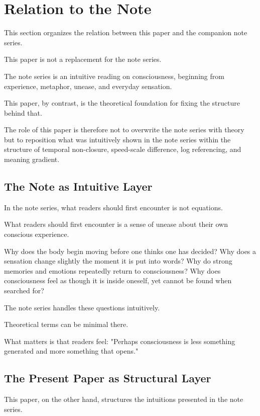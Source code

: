 \section{Relation to the Note}


This section organizes the relation between this paper and the companion note series.

This paper is not a replacement for the note series.

The note series is an intuitive reading on consciousness, beginning from experience, metaphor, unease, and everyday sensation.

This paper, by contrast, is the theoretical foundation for fixing the structure behind that.

The role of this paper is therefore not to overwrite the note series with theory but to reposition what was intuitively shown in the note series within the structure of temporal non-closure, speed-scale difference, log referencing, and meaning gradient.

\subsection{The Note as Intuitive Layer}


In the note series, what readers should first encounter is not equations.

What readers should first encounter is a sense of unease about their own conscious experience.

Why does the body begin moving before one thinks one has decided? Why does a sensation change slightly the moment it is put into words? Why do strong memories and emotions repeatedly return to consciousness? Why does consciousness feel as though it is inside oneself, yet cannot be found when searched for?

The note series handles these questions intuitively.

Theoretical terms can be minimal there.

What matters is that readers feel: "Perhaps consciousness is less something generated and more something that opens."

\subsection{The Present Paper as Structural Layer}


This paper, on the other hand, structures the intuitions presented in the note series.

